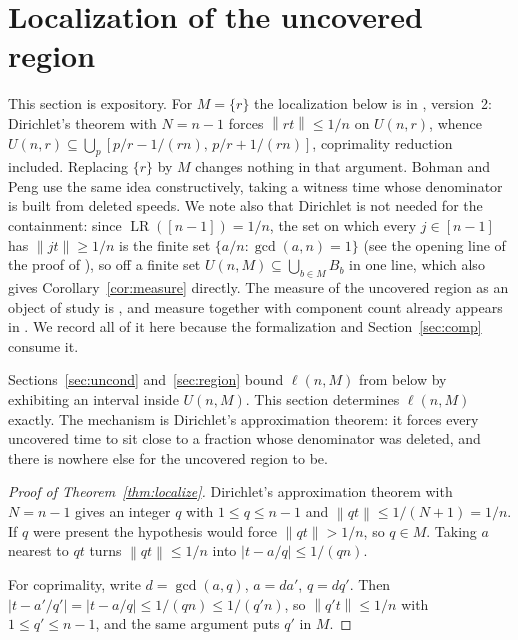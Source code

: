 \documentclass[11pt]{amsart}
\theoremstyle{plain}
\theoremstyle{definition}
\newcommand{\LR}{\operatorname{LR}}
\newcommand{\nrm}[1]{\left\lVert #1 \right\rVert}
\begin{document}
\section{Localization of the uncovered region}\label{sec:localize}

This section is expository. For $M=\{r\}$ the localization below is in \cite[\S2: Lemmas~2.1 and~2.2 and the first paragraph of the proof of Lemma~2.4; the case $2r>n-1$ is Lemma~2.5]{zhang}, version~2:
Dirichlet's theorem with $N=n-1$ forces $\nrm{rt}\le1/n$ on $U(n,r)$, whence
$U(n,r)\subseteq\bigcup_p[p/r-1/(rn),\,p/r+1/(rn)]$, coprimality reduction included. Replacing
$\{r\}$ by $M$ changes nothing in that argument. Bohman and Peng \cite[\S3]{bp} use the same idea
constructively, taking a witness time whose denominator is built from deleted speeds. We note also
that Dirichlet is not needed for the containment: since $\LR([n-1])=1/n$, the set on which every
$j\in[n-1]$ has $\nrm{jt}\ge1/n$ is the finite set $\{a/n:\gcd(a,n)=1\}$ (see
the opening line of the proof of \cite[Prop.~10.4]{kravitz}), so off a finite set $U(n,M)\subseteq\bigcup_{b\in M}B_b$ in one line,
which also gives Corollary~\ref{cor:measure} directly. The measure of the uncovered region as an
object of study is \cite{cusick74}, and measure together with component count already appears in
\cite[Lemma~1]{cp}. We record all of it here because the formalization and Section~\ref{sec:comp}
consume it.

Sections~\ref{sec:uncond} and~\ref{sec:region} bound $\ell(n,M)$ from below by exhibiting an
interval inside $U(n,M)$. This section determines $\ell(n,M)$ exactly. The mechanism is Dirichlet's
approximation theorem: it forces every uncovered time to sit close to a fraction whose denominator
was deleted, and there is nowhere else for the uncovered region to be.



\begin{proof}[Proof of Theorem~\ref{thm:localize}]
Dirichlet's approximation theorem with $N=n-1$ gives an integer $q$ with $1\le q\le n-1$ and
$\nrm{qt}\le 1/(N+1)=1/n$. If $q$ were present the hypothesis would force $\nrm{qt}>1/n$, so
$q\in M$. Taking $a$ nearest to $qt$ turns $\nrm{qt}\le1/n$ into $|t-a/q|\le1/(qn)$.

For coprimality, write $d=\gcd(a,q)$, $a=da'$, $q=dq'$. Then $|t-a'/q'|=|t-a/q|\le 1/(qn)\le
1/(q'n)$, so $\nrm{q't}\le 1/n$ with $1\le q'\le n-1$, and the same argument puts $q'$ in $M$.
\end{proof}
\end{document}
